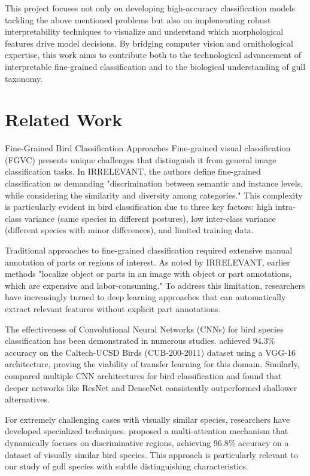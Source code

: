 \documentclass[a4paper,12pt]{article}
\begin{document}
This project focuses not only on developing high-accuracy classification models tackling the above mentioned problems but also on implementing robust interpretability techniques to visualize and understand which morphological features drive model decisions. By bridging computer vision and ornithological expertise, this work aims to contribute both to the technological advancement of interpretable fine-grained classification and to the biological understanding of gull taxonomy.

   
\newpage
\section{Related Work}


Fine-Grained Bird Classification Approaches
Fine-grained visual classification (FGVC) presents unique challenges that distinguish it from general image classification tasks. In \citep{wei2021fine} IRRELEVANT, the authors define fine-grained classification as demanding "discrimination between semantic and instance levels, while considering the similarity and diversity among categories." This complexity is particularly evident in bird classification due to three key factors: high intra-class variance (same species in different postures), low inter-class variance (different species with minor differences), and limited training data\citep{he2022bird}.

Traditional approaches to fine-grained classification required extensive manual annotation of parts or regions of interest. As noted by \citep{zhang2022unsupervised} IRRELEVANT, earlier methods "localize object or parts in an image with object or part annotations, which are expensive and labor-consuming." To address this limitation, researchers have increasingly turned to deep learning approaches that can automatically extract relevant features without explicit part annotations.

The effectiveness of Convolutional Neural Networks (CNNs) for bird species classification has been demonstrated in numerous studies. \citep{zhang2019bird} achieved 94.3\% accuracy on the Caltech-UCSD Birds (CUB-200-2011) dataset using a VGG-16 architecture, proving the viability of transfer learning for this domain. Similarly, \citep{marini2018bird} compared multiple CNN architectures for bird classification and found that deeper networks like ResNet and DenseNet consistently outperformed shallower alternatives.

For extremely challenging cases with visually similar species, researchers have developed specialized techniques. \citep{he2022bird} proposed a multi-attention mechanism that dynamically focuses on discriminative regions, achieving 96.8\% accuracy on a dataset of visually similar bird species. This approach is particularly relevant to our study of gull species with subtle distinguishing characteristics.
\end{document}
